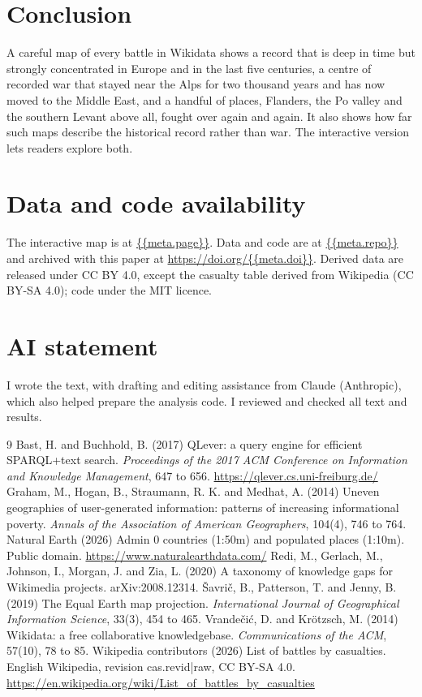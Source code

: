 \documentclass[11pt,a4paper]{article}
\begin{document}
\section{Conclusion}
A careful map of every battle in Wikidata shows a record that is deep in time but strongly concentrated in Europe and in the last five centuries, a centre of recorded war that stayed near the Alps for two thousand years and has now moved to the Middle East, and a handful of places, Flanders, the Po valley and the southern Levant above all, fought over again and again. It also shows how far such maps describe the historical record rather than war. The interactive version lets readers explore both.

\section*{Data and code availability}
The interactive map is at \url{{{meta.page}}}. Data and code are at \url{{{meta.repo}}} and archived with this paper at \url{https://doi.org/{{meta.doi}}}. Derived data are released under CC BY 4.0, except the casualty table derived from Wikipedia (CC BY-SA 4.0); code under the MIT licence.

\section*{AI statement}
I wrote the text, with drafting and editing assistance from Claude (Anthropic), which also helped prepare the analysis code. I reviewed and checked all text and results.

\begin{thebibliography}{9}
 Bast, H. and Buchhold, B. (2017) QLever: a query engine for efficient SPARQL+text search. \emph{Proceedings of the 2017 ACM Conference on Information and Knowledge Management}, 647 to 656. \url{https://qlever.cs.uni-freiburg.de/}
 Graham, M., Hogan, B., Straumann, R. K. and Medhat, A. (2014) Uneven geographies of user-generated information: patterns of increasing informational poverty. \emph{Annals of the Association of American Geographers}, 104(4), 746 to 764.
 Natural Earth (2026) Admin 0 countries (1:50m) and populated places (1:10m). Public domain. \url{https://www.naturalearthdata.com/}
 Redi, M., Gerlach, M., Johnson, I., Morgan, J. and Zia, L. (2020) A taxonomy of knowledge gaps for Wikimedia projects. arXiv:2008.12314.
 Šavrič, B., Patterson, T. and Jenny, B. (2019) The Equal Earth map projection. \emph{International Journal of Geographical Information Science}, 33(3), 454 to 465.
 Vrandečić, D. and Krötzsch, M. (2014) Wikidata: a free collaborative knowledgebase. \emph{Communications of the ACM}, 57(10), 78 to 85.
 Wikipedia contributors (2026) List of battles by casualties. English Wikipedia, revision {{cas.revid|raw}}, CC BY-SA 4.0. \url{https://en.wikipedia.org/wiki/List_of_battles_by_casualties}
\end{thebibliography}
\end{document}
